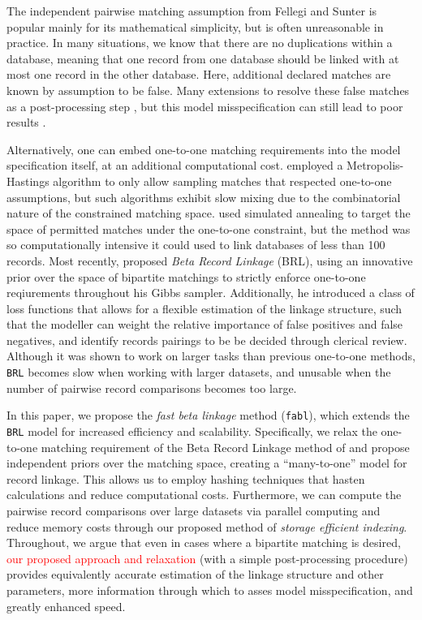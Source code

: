 \documentclass[12pt,letterpaper]{article}
\newcommand{\1}[1]{\mathbb{I}\!\left[#1\right]} %
\begin{document}
	The independent pairwise matching assumption from Fellegi and Sunter is popular mainly for its mathematical simplicity, but is often unreasonable in practice. In many situations, we know that there are no duplications within a database, meaning that one record from one database should be linked with at most one record in the other database. Here, additional declared matches are known by assumption to be false. Many extensions to \cite{fellegi_theory_1969} resolve these false matches as a post-processing step \citep{jaro1989}, but this model misspecification can still lead to poor results \citep{sadinle_bayesian_2017}.
	
	Alternatively, one can embed one-to-one matching requirements into the model specification itself, at an additional computational cost. \cite{larsen2005} employed a Metropolis-Hastings algorithm to only allow sampling matches that respected one-to-one assumptions, but such algorithms exhibit slow mixing due to the combinatorial nature of the constrained matching space. \cite{fortunato_2010} used simulated annealing to target the space of permitted matches under the one-to-one constraint, but the method was so computationally intensive it could used to link databases of less than 100 records. Most recently, \cite{sadinle_bayesian_2017} proposed \emph{Beta Record Linkage} (BRL), using an innovative prior over the space of bipartite matchings to strictly enforce one-to-one reqiurements throughout his Gibbs sampler. Additionally, he introduced a class of loss functions that allows for a flexible estimation of the linkage structure, such that the modeller can weight the relative importance of false positives and false negatives, and identify records pairings to be be decided through clerical review. Although it was shown to work on larger tasks than previous one-to-one methods, \texttt{BRL} becomes slow when working with larger datasets, and unusable when the number of pairwise record comparisons becomes too large. 
	
	In this paper, we propose the \emph{fast beta linkage} method (\texttt{fabl}), which extends the \texttt{BRL} model for increased efficiency and scalability. Specifically, we relax the one-to-one matching requirement of the Beta Record Linkage method of \citep{sadinle_bayesian_2017} and propose independent priors over the matching space, creating a ``many-to-one'' model for record linkage. This allows us to employ hashing techniques that hasten calculations and reduce computational costs. Furthermore, we can compute the pairwise record comparisons over large datasets via parallel computing and reduce memory costs through our proposed method of \emph{storage efficient indexing}. Throughout, we argue that even in cases where a bipartite matching is desired, \textcolor{red}{our proposed approach and relaxation} (with a simple post-processing procedure) provides equivalently accurate estimation of the linkage structure and other parameters, more information through which to asses model misspecification, and greatly enhanced speed. 
	
\end{document}
